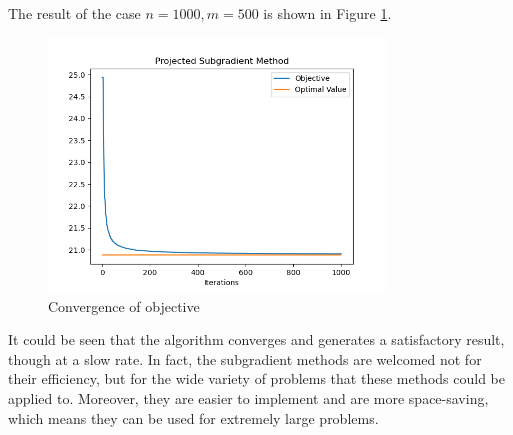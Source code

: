 \documentclass[11pt]{article}
\begin{document}
The result of the case \(n=1000,m=500\) is shown in Figure \ref{fig:result}.

\begin{figure}[h]
    \centering
    \includegraphics[width=0.8\textwidth]{img/result.png}
    \caption{Convergence of objective}
    \label{fig:result}
\end{figure}

It could be seen that the algorithm converges and generates a satisfactory result, though at a slow rate. In fact, the subgradient methods are welcomed not for their efficiency, but for the wide variety of problems that these methods could be applied to. Moreover, they are easier to implement and are more space-saving, which means they can be used for extremely large problems.




\end{document}
